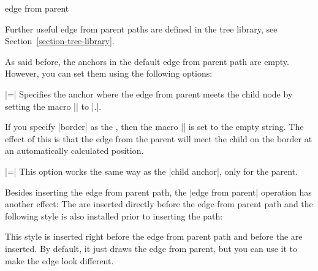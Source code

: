 \begin{pathoperation}{edge from parent}{}
\begin{itemize}
    Further useful edge from parent paths are defined in the tree
    library, see Section~\ref{section-tree-library}.

    As said before, the anchors in the default edge from parent path
    are empty. However, you can set them using the following options:
    \begin{itemize}
      |=|
      Specifies the anchor where the edge from parent meets the child
      node by setting the macro |\tikzchildanchor| to
      |.|.

      If you specify |border| as the , then the macro
      |\tikzchildanchor| is set to the empty string. The effect of
      this is that the edge from the parent will meet the child on the
      border at an automatically calculated position.
\begin{codeexample}[]
\end{codeexample}
      |=|
      This option works the same way as the |child anchor|, only for
      the parent.
    \end{itemize}
  \end{itemize}

  Besides inserting the edge from parent path, the |edge from parent|
  operation has another effect: The  are inserted
  directly before the edge from parent path and the following style is
  also installed prior to inserting the path:
  \begin{itemize}
    This style is inserted right before the edge from parent path and
    before the  are inserted. By default, it just draws
    the edge from parent, but you can use it to make the edge look
    different. 
\begin{codeexample}[]
\end{codeexample}
  \end{itemize}


\end{pathoperation}
